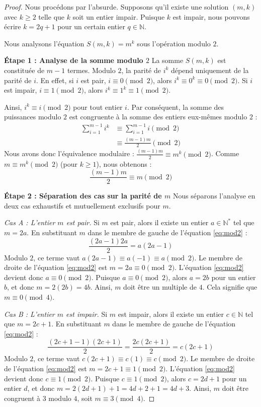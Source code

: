 \documentclass[11pt,a4paper,french]{article}
\theoremstyle{definition}
\theoremstyle{remark}
\begin{document}
\begin{proof}
Nous procédons par l'absurde. Supposons qu'il existe une solution $(m, k)$ avec $k \ge 2$ telle que $k$ soit un entier impair. Puisque $k$ est impair, nous pouvons écrire $k = 2q + 1$ pour un certain entier $q \in \mathbb{N}$.

Nous analysons l'équation $S(m, k) = m^k$ sous l'opération modulo $2$.

\textbf{Étape 1 : Analyse de la somme modulo $2$}
La somme $S(m, k)$ est constituée de $m-1$ termes. Modulo $2$, la parité de $i^k$ dépend uniquement de la parité de $i$. En effet, si $i$ est pair, $i \equiv 0 \pmod 2$, alors $i^k \equiv 0^k \equiv 0 \pmod 2$. Si $i$ est impair, $i \equiv 1 \pmod 2$, alors $i^k \equiv 1^k \equiv 1 \pmod 2$.

Ainsi, $i^k \equiv i \pmod 2$ pour tout entier $i$.
Par conséquent, la somme des puissances modulo $2$ est congruente à la somme des entiers eux-mêmes modulo $2$ :
\begin{align}
\sum_{i=1}^{m-1} i^k &\equiv \sum_{i=1}^{m-1} i \pmod 2 \\
&\equiv \frac{(m-1)m}{2} \pmod 2
\end{align}
Nous avons donc l'équivalence modulaire : $\frac{(m-1)m}{2} \equiv m^k \pmod 2$.
Comme $m \equiv m^k \pmod 2$ (pour $k \ge 1$), nous obtenons :
\begin{equation}
\label{eq:mod2}
\frac{(m-1)m}{2} \equiv m \pmod 2
\end{equation}

\textbf{Étape 2 : Séparation des cas sur la parité de $m$}
Nous séparons l'analyse en deux cas exhaustifs et mutuellement exclusifs pour $m$.

\textit{Cas A : L'entier $m$ est pair.}
Si $m$ est pair, alors il existe un entier $a \in \mathbb{N}^*$ tel que $m = 2a$.
En substituant $m$ dans le membre de gauche de l'équation \eqref{eq:mod2} :
\begin{equation}
\frac{(2a-1)2a}{2} = a(2a-1)
\end{equation}
Modulo $2$, ce terme vaut $a(2a-1) \equiv a(-1) \equiv a \pmod 2$.
Le membre de droite de l'équation \eqref{eq:mod2} est $m = 2a \equiv 0 \pmod 2$.
L'équation \eqref{eq:mod2} devient donc $a \equiv 0 \pmod 2$.
Puisque $a \equiv 0 \pmod 2$, alors $a = 2b$ pour un entier $b$, et donc $m = 2(2b) = 4b$.
Ainsi, $m$ doit être un multiple de $4$. Cela signifie que $m \equiv 0 \pmod 4$.

\textit{Cas B : L'entier $m$ est impair.}
Si $m$ est impair, alors il existe un entier $c \in \mathbb{N}$ tel que $m = 2c + 1$.
En substituant $m$ dans le membre de gauche de l'équation \eqref{eq:mod2} :
\begin{equation}
\frac{(2c+1-1)(2c+1)}{2} = \frac{2c(2c+1)}{2} = c(2c+1)
\end{equation}
Modulo $2$, ce terme vaut $c(2c+1) \equiv c(1) \equiv c \pmod 2$.
Le membre de droite de l'équation \eqref{eq:mod2} est $m = 2c+1 \equiv 1 \pmod 2$.
L'équation \eqref{eq:mod2} devient donc $c \equiv 1 \pmod 2$.
Puisque $c \equiv 1 \pmod 2$, alors $c = 2d + 1$ pour un entier $d$, et donc $m = 2(2d+1) + 1 = 4d + 2 + 1 = 4d + 3$.
Ainsi, $m$ doit être congruent à $3$ modulo $4$, soit $m \equiv 3 \pmod 4$.


\end{proof}
\end{document}
